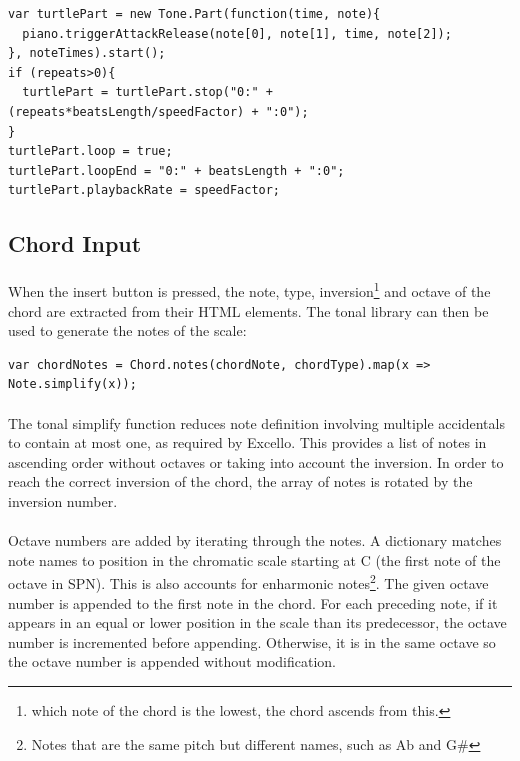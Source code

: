 \begin{verbatim}
var turtlePart = new Tone.Part(function(time, note){
  piano.triggerAttackRelease(note[0], note[1], time, note[2]);
}, noteTimes).start();
if (repeats>0){
  turtlePart = turtlePart.stop("0:" + (repeats*beatsLength/speedFactor) + ":0");
}
turtlePart.loop = true;
turtlePart.loopEnd = "0:" + beatsLength + ":0";
turtlePart.playbackRate = speedFactor;
\end{verbatim}

\subsection{Chord Input}

\paragraph{} When the insert button is pressed, the note, type, inversion\footnote{which note of the chord is the lowest, the chord ascends from this.} and octave of the chord are extracted from their HTML elements. The tonal library can then be used to generate the notes of the scale:

\begin{verbatim}
var chordNotes = Chord.notes(chordNote, chordType).map(x => Note.simplify(x));
\end{verbatim}

\paragraph{} The tonal simplify function reduces note definition involving multiple accidentals to contain at most one, as required by Excello. This provides a list of notes in ascending order without octaves or taking into account the inversion. In order to reach the correct inversion of the chord, the array of notes is rotated by the inversion number.

\paragraph{} Octave numbers are added by iterating through the notes. A dictionary matches note names to position in the chromatic scale starting at C (the first note of the octave in SPN). This is also accounts for enharmonic notes\footnote{Notes that are the same pitch but different names, such as Ab and G\#}. The given octave number is appended to the first note in the chord. For each preceding note, if it appears in an equal or lower position in the scale than its predecessor, the octave number is incremented before appending. Otherwise, it is in the same octave so the octave number is appended without modification.

